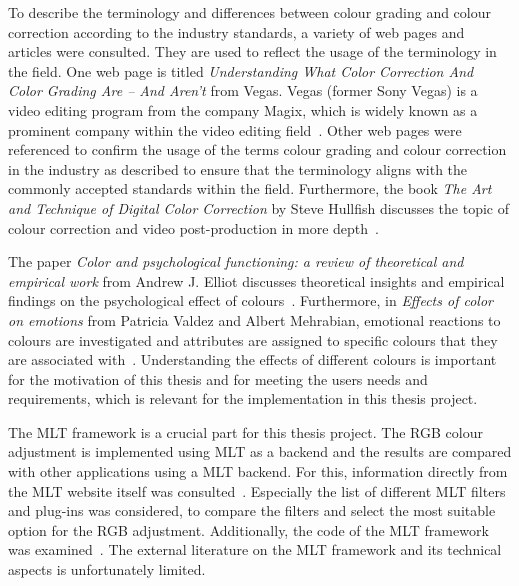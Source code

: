 \documentclass[../MasterThesis.tex]{subfiles}
\begin{document}
\begin{description}[font=\color{RedViolet!80!black}, style=nextline]
		To describe the terminology and differences between colour grading and colour correction according to the industry standards, a variety of web pages and articles were consulted. They are used to reflect the usage of the terminology in the field. 
		One web page is titled \textit{Understanding What Color Correction And Color Grading Are – And Aren’t} from Vegas. Vegas (former Sony Vegas) is a video editing program from the company Magix, which is widely known as a prominent company within the video editing field~\cite{cc_cg_1}.
		Other web pages were referenced to confirm the usage of the terms colour grading and colour correction in the industry as described to ensure that the terminology aligns with the commonly accepted standards within the field. 
		Furthermore, the book \textit{The Art and Technique of Digital Color Correction} by Steve Hullfish discusses the topic of colour correction and video post-production in more depth~\cite{cc1}.
		
		
		
		\item[Effects of different colour]
		
		
		The paper \textit{Color and psychological functioning: a review of theoretical and empirical work} from Andrew J. Elliot discusses theoretical insights and empirical findings on the psychological effect of colours~\cite{colour}.
		Furthermore, in \textit{Effects of color on emotions} from Patricia Valdez and Albert Mehrabian, emotional reactions to colours are investigated and attributes are assigned to specific colours that they are associated with~\cite{colour2}.
		Understanding the effects of different colours is important for the motivation of this thesis and for meeting the users needs and requirements, which is relevant for the implementation in this thesis project.
		

		
	
		
		
		\item[MLT framework]
		
		
		The MLT framework is a crucial part for this thesis project. 
		The RGB colour adjustment is implemented using MLT as a backend and the results are compared with other applications using a MLT backend.
		For this, information directly from the MLT website itself was consulted~\cite{melt}.
		Especially the list of different MLT filters and plug-ins was considered, to compare the filters and select the most suitable option for the RGB adjustment.
		Additionally, the code of the MLT framework was examined~\cite{melt_filters, melt_code}.
		The external literature on the MLT framework and its technical aspects is unfortunately limited.
		

\end{description}
\end{document}
